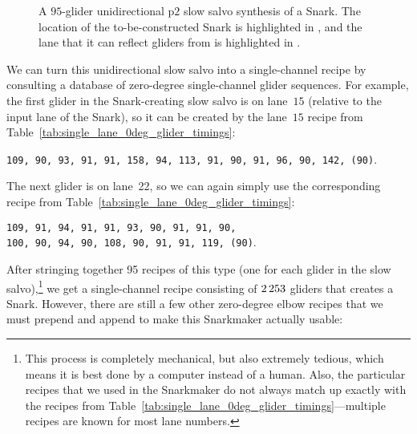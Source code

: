 \begin{figure}[!htb]
	\centering
	\caption{A $95$-glider unidirectional p$2$ slow salvo synthesis of a Snark. The location of the to-be-constructed Snark is highlighted in , and the lane that it can reflect gliders from is highlighted in .}\label{fig:snark_slow_salvo}
\end{figure}

We can turn this unidirectional slow salvo into a single-channel recipe by consulting a database of zero-degree single-channel glider sequences. For example, the first glider in the Snark-creating slow salvo is on lane~$15$ (relative to the input lane of the Snark), so it can be created by the lane~$15$ recipe from Table~\ref{tab:single_lane_0deg_glider_timings}:
\begin{center}
	\texttt{\small 109, 90, 93, 91, 91, 158, 94, 113, 91, 90, 91, 96, 90, 142, {\color{gray}(90)}}.
\end{center}
The next glider is on lane~22, so we can again simply use the corresponding recipe from Table~\ref{tab:single_lane_0deg_glider_timings}:
\begin{center}
	\texttt{\small 109, 91, 94, 91, 91, 93, 90, 91, 91, 90, \\ 100, 90, 94, 90, 108, 90, 91, 91, 119, {\color{gray}(90)}}.
\end{center}

After stringing together 95 recipes of this type (one for each glider in the slow salvo),\footnote{This process is completely mechanical, but also extremely tedious, which means it is best done by a computer instead of a human. Also, the particular recipes that we used in the Snarkmaker do not always match up exactly with the recipes from Table~\ref{tab:single_lane_0deg_glider_timings}---multiple recipes are known for most lane numbers.} we get a single-channel recipe consisting of $2{\,}253$ gliders that creates a Snark. However, there are still a few other zero-degree elbow recipes that we must prepend and append to make this Snarkmaker actually usable:\smallskip

